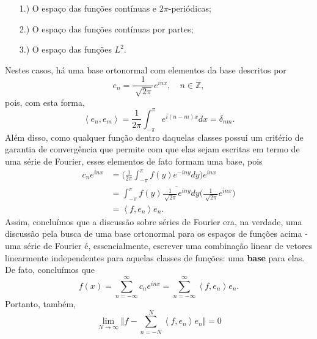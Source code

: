\documentclass[../pde_notes.tex]{subfiles}
\begin{document}
\begin{itemize}
	\item[1.)] O espaço das funções contínuas e \(2\pi \)-periódicas;
	\item[2.)] O espaço das funções contínuas por partes;
	\item[3.)] O espaço das funções \(L^{2}.\)
\end{itemize}
Nestes casos, há uma base ortonormal com elementos da base descritos por
\[
	e_{n}=\frac{1}{\sqrt[]{2\pi }}e^{inx},\quad n\in \mathbb{Z},
\]
pois, com esta forma,
\[
	\left< e_{n}, e_{m} \right>=\frac{1}{2\pi }\int_{-\pi }^{\pi }e^{i(n-m)x}dx = \delta_{nm}.
\]
Além disso, como qualquer função dentro daquelas classes possui um critério de garantia de convergência que permite com que elas sejam escritas em termo de uma série de Fourier, esses elementos de fato formam uma base, pois
\begin{align*}
	c_{n}e^{inx} & =\biggl(\frac{1}{2\pi }\int_{-\pi }^{\pi }f(y)e^{-iny}dy\biggr)e^{inx}                                             \\
	             & =\int_{-\pi }^{\pi }f(y)\overline{\frac{1}{\sqrt[]{2\pi }}e^{iny}}dy \biggl(\frac{1}{\sqrt[]{2\pi }}e^{inx}\biggr) \\
	             & = \left< f, e_{n} \right>e_{n}.
\end{align*}
Assim, concluímos que a discussão sobre séries de Fourier era, na verdade, uma discussão pela busca de uma base ortonormal para os espaços de funções acima - uma série de Fourier é, essencialmente, escrever uma combinação linear de vetores linearmente independentes para aquelas classes de funções: uma \textbf{base} para elas. De fato, concluímos que
\[
	f(x)=\sum\limits_{n=-\infty}^{\infty}c_{n}e^{inx}=\sum\limits_{n=-\infty}^{\infty}\left< f, e_{n} \right>e_{n}.
\]
Portanto, também,
\[
	\lim_{N\to \infty}\biggl\Vert f - \sum\limits_{n=-N}^{N}\left< f, e_{n} \right>e_{n} \biggr\Vert=0
\]
\end{document}
